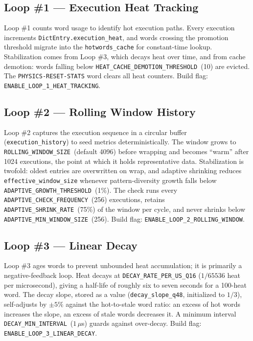\subsection{Loop \#1 --- Execution Heat Tracking}

Loop \#1 counts word usage to identify hot execution paths. Every execution
increments \texttt{DictEntry.execution\_heat}, and words crossing the promotion
threshold migrate into the \texttt{hotwords\_cache} for constant-time lookup.
Stabilization comes from Loop \#3, which decays heat over time, and from cache
demotion: words falling below \texttt{HEAT\_CACHE\_DEMOTION\_THRESHOLD}~(10)
are evicted. The \texttt{PHYSICS-RESET-STATS} word clears all heat counters.
Build flag: \texttt{ENABLE\_LOOP\_1\_HEAT\_TRACKING}.

\subsection{Loop \#2 --- Rolling Window History}

Loop \#2 captures the execution sequence in a circular buffer
(\texttt{execution\_history}) to seed metrics deterministically. The window
grows to \texttt{ROLLING\_WINDOW\_SIZE}~(default 4096) before wrapping and
becomes ``warm'' after 1024 executions, the point at which it holds
representative data. Stabilization is twofold: oldest entries are overwritten
on wrap, and adaptive shrinking reduces \texttt{effective\_window\_size}
whenever pattern-diversity growth falls below
\texttt{ADAPTIVE\_GROWTH\_THRESHOLD}~(1\%). The check runs every
\texttt{ADAPTIVE\_CHECK\_FREQUENCY}~(256) executions, retains
\texttt{ADAPTIVE\_SHRINK\_RATE}~(75\%) of the window per cycle, and never
shrinks below \texttt{ADAPTIVE\_MIN\_WINDOW\_SIZE}~(256). Build flag:
\texttt{ENABLE\_LOOP\_2\_ROLLING\_WINDOW}.

\subsection{Loop \#3 --- Linear Decay}

Loop \#3 ages words to prevent unbounded heat accumulation; it is primarily a
negative-feedback loop. Heat decays at \texttt{DECAY\_RATE\_PER\_US\_Q16}
($1/65536$ heat per microsecond), giving a half-life of roughly six to seven
seconds for a 100-heat word. The decay slope, stored as a \Qtype{} value
(\texttt{decay\_slope\_q48}, initialized to $1/3$), self-adjusts by $\pm 5\%$
against the hot-to-stale word ratio: an excess of hot words increases the slope,
an excess of stale words decreases it. A minimum interval
\texttt{DECAY\_MIN\_INTERVAL}~($1\,\mu$s) guards against over-decay. Build flag:
\texttt{ENABLE\_LOOP\_3\_LINEAR\_DECAY}.

